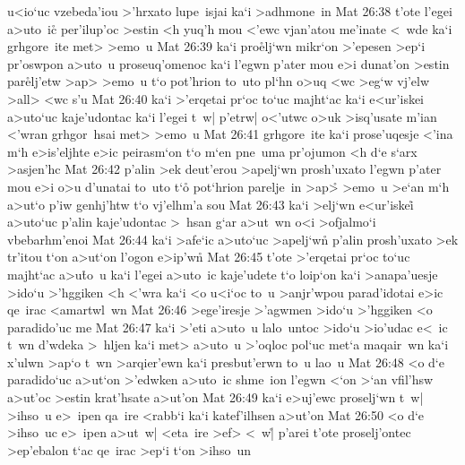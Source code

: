 u<io`uc
vzebeda'iou
>'hrxato
lupe~isjai
ka`i
>adhmone~in\bibvsend
\vs Mat 26:38
t'ote
l'egei
a>uto~i\r{c}
per'ilup'oc
>estin
<h
yuq'h
mou
<'ewc
vjan'atou
me'inate
<~wde
ka`i
grhgore~ite
met>
>emo~u\bibvsend
\vs Mat 26:39
ka`i
pro\r{e}lj`wn
mikr`on
>'epesen
>ep`i
pr'oswpon
a>uto~u
proseuq'omenoc
ka`i
l'egwn
p'ater
mou
e>i
dunat'on
>estin
par\r{e}lj'etw
>ap>
>emo~u
t`o
pot'hrion
to~uto
pl`hn
o>uq
<wc
>eg`w
vj'elw
>all>
<wc
s'u\bibvsend
\vs Mat 26:40
ka`i
>'erqetai
pr`oc
to`uc
majht`ac
ka`i
e<ur'iskei
a>uto`uc
kaje'udontac
ka`i
l'egei
t~w|
p'etrw|
o<'utwc
o>uk
>isq'usate
m'ian
<'wran
grhgor~hsai
met>
>emo~u\bibvsend
\vs Mat 26:41
grhgore~ite
ka`i
prose'uqesje
<'ina
m`h
e>is'eljhte
e>ic
peirasm`on
t`o
m`en
pne~uma
pr'ojumon
<h
d`e
s`arx
>asjen'hc\bibvsend
\vs Mat 26:42
p'alin
>ek
deut'erou
>apelj`wn
prosh'uxato
l'egwn
p'ater
mou
e>i
o>u
d'unatai
to~uto
t`o\r{}
pot`hrion
parelje~in
>ap>\r{}
>emo~u
>e`an
m`h
a>ut`o
p'iw
genhj'htw
t`o
vj'elhm'a
sou\bibvsend
\vs Mat 26:43
ka`i
>elj`wn
e<ur'iskei\r{}
a>uto`uc
p'alin
kaje'udontac
>~hsan
g`ar
a>ut~wn
o<i
>ofjalmo`i
vbebarhm'enoi\bibvsend
\vs Mat 26:44
ka`i
>afe`ic
a>uto`uc
>apelj`wn\r{}
p'alin
prosh'uxato
>ek
tr'itou
t`on
a>ut`on
l'ogon
e>ip'w\r{n}\bibvsend
{}
\vs Mat 26:45
t'ote
>'erqetai
pr`oc
to`uc
majht`ac
a>u\r{t}o~u
ka`i
l'egei
a>uto~ic
kaje'udete
t`o
loip`on
ka`i
>anapa'uesje
>ido`u
>'hggiken
<h
<'wra
ka`i
<o
u<i`oc
to~u
>anjr'wpou
parad'idotai
e>ic
qe~irac
<amartwl~wn\bibvsend
\vs Mat 26:46
>ege'iresje
>'agwmen
>ido`u
>'hggiken
<o
paradido'uc
me\bibvsend
\vs Mat 26:47
ka`i
>'eti
a>uto~u
lalo~untoc
>ido`u
>io'udac
e<~ic
t~wn
d'wdeka
>~hljen
ka`i
met>
a>uto~u
>'oqloc
pol`uc
met`a
maqair~wn
ka`i
x'ulwn
>ap`o
t~wn
>arqier'ewn
ka`i
presbut'erwn
to~u
lao~u\bibvsend
\vs Mat 26:48
<o
d`e
paradido`uc
a>ut`on
>'edwken
a>uto~ic
shme~ion
l'egwn
<`on
>`an
vfil'hsw
a>ut'oc
>estin
krat'hsate
a>ut'on\bibvsend
\vs Mat 26:49
ka`i
e>uj'ewc
proselj`wn
t~w|
>ihso~u
e>~ipen
qa~ire
<rabb`i
ka`i
katef'ilhsen
a>ut'on\bibvsend
\vs Mat 26:50
<o
d`e
>ihso~uc
e>~ipen
a>ut~w|
<eta~ire
>ef>
<~w|\r{}
p'arei
t'ote
proselj'ontec
>ep'ebalon
t`ac
qe~irac
>ep`i
t`on
>ihso~un
